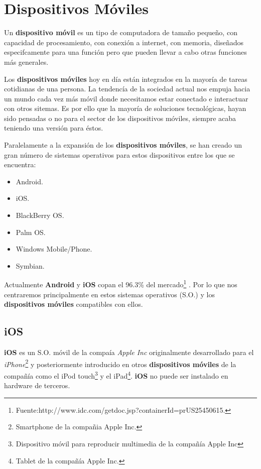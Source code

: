 \newpage

\section{Dispositivos Móviles}

Un \textbf{dispositivo móvil} es un tipo de computadora de tamaño pequeño, con capacidad de procesamiento, con conexión a internet, con memoria, diseñados especifcamente para una función pero que pueden llevar a cabo otras funciones más generales.

\bigskip
Los \textbf{dispositivos móviles} hoy en día están integrados en la mayoría de tareas cotidianas de una persona. La tendencía de la sociedad actual nos empuja hacia un mundo cada vez más móvil donde necesitamos estar conectado e interactuar con otros sitemas. Es por ello que la mayoría de soluciones tecnológicas, hayan sido pensadas o no para el sector de los dispositivos móviles, siempre acaba teniendo una versión para éstos.

\bigskip
Paralelamente a la expansión de los \textbf{dispositivos móviles}, se han creado un gran número de sistemas operativos para estos dispositivos entre los que se encuentra:

\begin{itemize}
  \item Android.
  \item iOS.
  \item BlackBerry OS.
  \item Palm OS.
  \item Windows Mobile/Phone.
  \item Symbian.
\end{itemize}

\bigskip
Actualmente \textbf{Android} y \textbf{iOS} copan el 96.3\% del mercado\footnote{Fuente:http://www.idc.com/getdoc.jsp?containerId=prUS25450615.} . Por lo que nos centraremos principalmente en estos sistemas operativos (S.O.) y los \textbf{dispositivos móviles} compatibles con ellos.

\subsection{iOS}

\textbf{iOS} es un S.O. móvil de la compaía \textit{Apple Inc} originalmente desarrollado para el \textit{iPhone}\footnote{Smartphone de la compañia Apple Inc.} y posteriormente introducido en otros \textbf{dispositivos móviles} de la compañía como el iPod touch\footnote{Dispositivo móvil para reproducir multimedia de la compañía Apple Inc} y el iPad\footnote{Tablet de la compañía Apple Inc.}. \textbf{iOS} no puede ser instalado en hardware de terceros.

